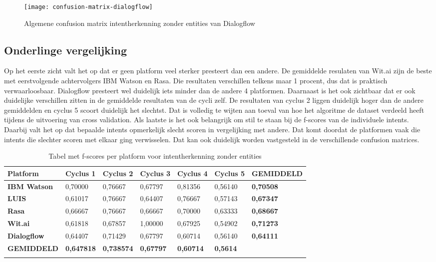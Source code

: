 \begin{figure}[H]
    \label{fig:confusion-matrix-dialogflow}
    \centering
    \texttt{[image: confusion-matrix-dialogflow]}
    \caption{Algemene confusion matrix intentherkenning zonder entities van Dialogflow}
\end{figure}

\subsection{Onderlinge vergelijking}
\label{subsec:intent-onderling}

Op het eerste zicht valt het op dat er geen platform veel sterker presteert dan een andere. De gemiddelde resulaten van Wit.ai zijn de beste met eerstvolgende achtervolgers IBM Watson en Rasa. Die resultaten verschillen telkens maar 1 procent, dus dat is praktisch verwaarloosbaar. Dialogflow presteert wel duidelijk iets minder dan de andere 4 platformen. Daarnaast is het ook zichtbaar dat er ook duidelijke verschillen zitten in de gemiddelde resultaten van de cycli zelf. De resultaten van cyclus 2 liggen duidelijk hoger dan de andere gemiddelden en cyclus 5 scoort duidelijk het slechtst. Dat is volledig te wijten aan toeval van hoe het algoritme de dataset verdeeld heeft tijdens de uitvoering van cross validation. Als laatste is het ook belangrijk om stil te staan bij de f-scores van de individuele intents. Daarbij valt het op dat bepaalde intents opmerkelijk slecht scoren in vergelijking met andere. Dat komt doordat de platformen vaak die intents die slechter scoren met elkaar ging verwisselen. Dat kan ook duidelijk worden vastgesteld in de verschillende confusion matrices.

\begin{center}
    \begin{longtable}{| l | l | l | l | l |  l | l |}
        \hline
        \textbf{Platform} & \textbf{Cyclus 1} & \textbf{Cyclus 2} & \textbf{Cyclus 3} & \textbf{Cyclus 4} & \textbf{Cyclus 5} & \textbf{GEMIDDELD} \\ \hline
        \textbf{IBM Watson} & 0,70000 & 0,76667 & 0,67797 & 0,81356 & 0,56140 & \textbf{0,70508} \\ \hline  
        \textbf{LUIS} & 0,61017 & 0,76667 & 0,64407 & 0,76667 & 0,57143 & \textbf{0,67347} \\ \hline  
        \textbf{Rasa} & 0,66667 & 0,76667 & 0,66667 & 0,70000 & 0,63333 & \textbf{0,68667} \\ \hline  
        \textbf{Wit.ai} & 0,61818 & 0,67857 & 1,00000 & 0,67925 & 0,54902 & \textbf{0,71273} \\ \hline  
        \textbf{Dialogflow} & 0,64407 & 0,71429 & 0,67797 & 0,60714 & 0,56140 & \textbf{0,64111} \\ \hline  
        \textbf{GEMIDDELD} & \textbf{0,647818} & \textbf{0,738574} & \textbf{0,67797} & \textbf{0,60714} & \textbf{0,5614} &    \\ \hline
        \caption{Tabel met f-scores per platform voor intentherkenning zonder entities}                                    
    \end{longtable}
    \label{tbl:results-intent-no-entity}
\end{center}

